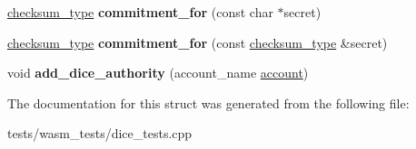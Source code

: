 \begin{DoxyCompactItemize}
\mbox{\hyperlink{classfc_1_1sha256}{checksum\+\_\+type}} {\bfseries commitment\+\_\+for} (const char $\ast$secret)
\item 
\mbox{\label{structdice__tester_affee3c3491a0ce67d06fd322f7d38f9a}} 
\mbox{\hyperlink{classfc_1_1sha256}{checksum\+\_\+type}} {\bfseries commitment\+\_\+for} (const \mbox{\hyperlink{classfc_1_1sha256}{checksum\+\_\+type}} \&secret)
\item 
\mbox{\label{structdice__tester_aa80a5e7dabd1a96cb4844a8939fdc945}} 
void {\bfseries add\+\_\+dice\+\_\+authority} (account\+\_\+name \mbox{\hyperlink{structaccount}{account}})
\end{DoxyCompactItemize}


The documentation for this struct was generated from the following file\+:\begin{DoxyCompactItemize}
\item 
tests/wasm\+\_\+tests/dice\+\_\+tests.\+cpp\end{DoxyCompactItemize}
